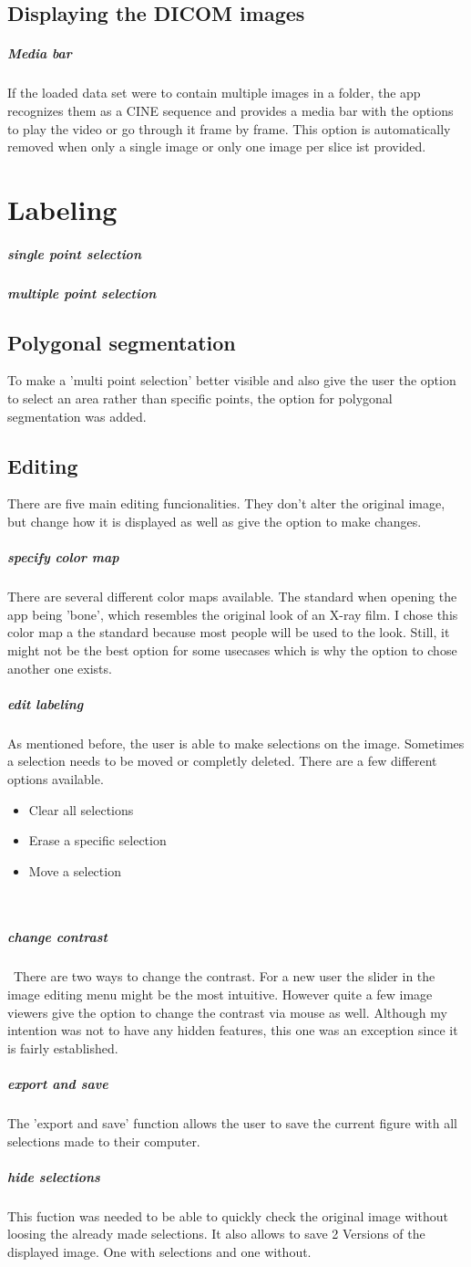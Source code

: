 \subsection{Displaying the DICOM images}
\label{Displaying the DICOM images}
\subparagraph{Media bar}
If the loaded data set were to contain multiple images in a folder, the app recognizes them as a CINE sequence and provides a media bar with the options to play the video or go through it frame by frame.
This option is automatically removed when only a single image or only one image per slice ist provided.

\section{Labeling}
\label{Labeling}
\subparagraph{single point selection}
\subparagraph{multiple point selection}

\subsection{Polygonal segmentation}
\label{Polygonal segmentation}
To make a 'multi point selection' better visible and also give the user the option to select an area rather than specific points, the option for polygonal segmentation was added.

\subsection{Editing}
\label{Editing}
There are five main editing funcionalities. They don't alter the original image, but change how it is displayed as well as give the option to make changes.
\subparagraph{specify color map}
There are several different color maps available. The standard when opening the app being 'bone', which resembles the original look of an X-ray film. I chose this color map a the standard because most people will be used to the look. Still, it might not be the best option for some usecases which is why the option to chose another one exists.
\subparagraph{edit labeling}
As mentioned before, the user is able to make selections on the image. Sometimes a selection needs to be moved or completly deleted. There are a few different options available.
\begin{itemize}
    \item Clear all selections
    \item Erase a specific selection
    \item Move a selection
\end{itemize}
 \subparagraph{change contrast}
 There are two ways to change the contrast. For a new user the slider in the image editing menu might be the most intuitive. However quite a few image viewers give the option to change the contrast via mouse as well. Although my intention was not to have any hidden features, this one was an exception since it is fairly established.
\subparagraph{export and save}
The 'export and save' function allows the user to save the current figure with all selections made to their computer.
\subparagraph{hide selections}
This fuction was needed to be able to quickly check the original image without loosing the already made selections. It also allows to save 2 Versions of the displayed image. One with selections and one without.
